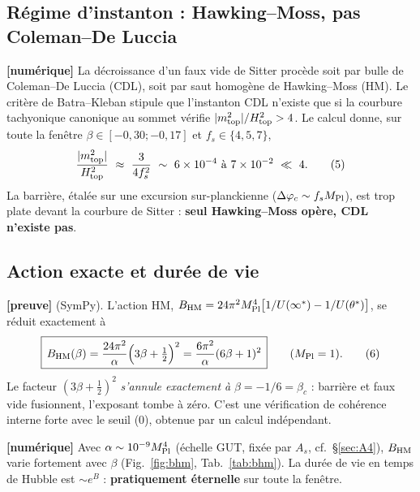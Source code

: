 \documentclass[11pt,a4paper]{article}
\newcommand{\Mpl}{M_{\rm Pl}}
\newcommand{\st}[1]{\textbf{\textcolor{blue!45!black}{[#1]}}}
\newcommand{\fpole}{\infty^*}
\begin{document}
\subsection{Régime d'instanton : Hawking–Moss, pas Coleman–De Luccia}
\st{numérique} La décroissance d'un faux vide de Sitter procède soit par bulle de Coleman–De Luccia (CDL), soit par saut homogène de Hawking–Moss (HM). Le critère de Batra–Kleban stipule que l'instanton CDL n'existe que si la courbure tachyonique canonique au sommet vérifie $|m^2_{\rm top}|/H^2_{\rm top}>4$. Le calcul donne, sur toute la fenêtre $\beta\in[-0{,}30;-0{,}17]$ et $f_s\in\{4,5,7\}$,
\begin{equation}
\frac{|m^2_{\rm top}|}{H^2_{\rm top}}\ \approx\ \frac{3}{4f_s^2}\ \sim\ 6\times10^{-4}\text{ à }7\times10^{-2}\ \ll\ 4. \tag{5}
\end{equation}
La barrière, étalée sur une excursion sur-planckienne ($\Delta\varphi_c\sim f_s\Mpl$), est trop plate devant la courbure de Sitter : \textbf{seul Hawking–Moss opère, CDL n'existe pas}.

\subsection{Action exacte et durée de vie}
\st{preuve} (SymPy). L'action HM, $B_{\rm HM}=24\pi^2\Mpl^4\big[1/U(\fpole)-1/U(\theta^*)\big]$, se réduit exactement à
\begin{equation}
\boxed{\,B_{\rm HM}(\beta)=\frac{24\pi^2}{\alpha}\Big(3\beta+\tfrac12\Big)^2=\frac{6\pi^2}{\alpha}(6\beta+1)^2\,}\qquad(\Mpl=1). \tag{6}
\end{equation}
Le facteur $(3\beta+\tfrac12)^2$ \emph{s'annule exactement à} $\beta=-1/6=\beta_c$ : barrière et faux vide fusionnent, l'exposant tombe à zéro. C'est une vérification de cohérence interne forte avec le seuil (0), obtenue par un calcul indépendant.

\st{numérique} Avec $\alpha\sim10^{-9}\Mpl^4$ (échelle GUT, fixée par $A_s$, cf.\ \S\ref{sec:A4}), $B_{\rm HM}$ varie fortement avec $\beta$ (Fig.~\ref{fig:bhm}, Tab.~\ref{tab:bhm}). La durée de vie en temps de Hubble est $\sim e^{B}$ : \textbf{pratiquement éternelle} sur toute la fenêtre.
\end{document}

